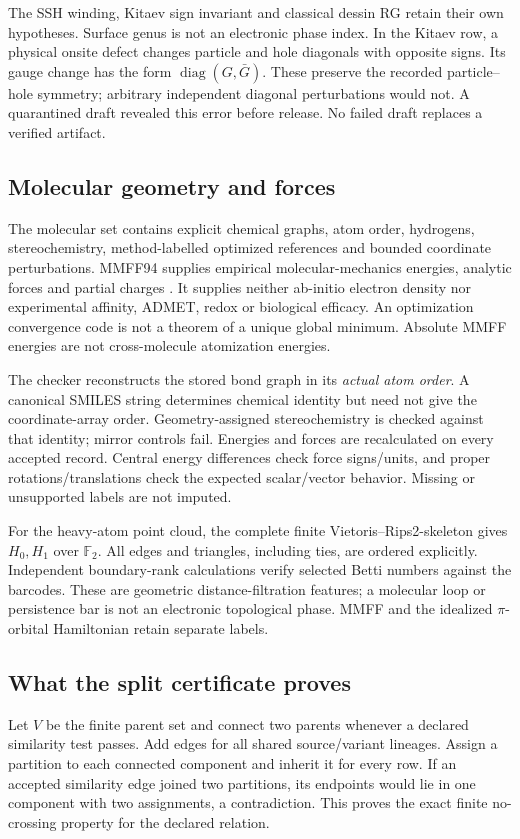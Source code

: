 \documentclass[11pt,oneside,openany]{book}
\theoremstyle{definition}\newtheorem{definition}[theorem]{Definition}
\theoremstyle{remark}\newtheorem{remark}[theorem]{Remark}
\begin{document}
The SSH winding, Kitaev sign invariant and classical dessin RG retain their
own hypotheses. Surface genus is not an electronic phase index. In the
Kitaev row, a physical onsite defect changes particle and hole diagonals with
opposite signs. Its gauge change has the form $\operatorname{diag}(G,\bar G)$.
These preserve the recorded particle--hole symmetry; arbitrary independent
diagonal perturbations would not. A quarantined draft revealed this error
before release. No failed draft replaces a verified artifact.

\subsection{Molecular geometry and forces}
The molecular set contains explicit chemical graphs, atom order, hydrogens,
stereochemistry, method-labelled optimized references and bounded coordinate
perturbations. MMFF94 supplies empirical molecular-mechanics energies, analytic
forces and partial charges \cite{DSRDKit}. It supplies neither ab-initio
electron density nor experimental affinity, ADMET, redox or biological efficacy.
An optimization convergence code is not a theorem of a unique global minimum.
Absolute MMFF energies are not cross-molecule atomization energies.

The checker reconstructs the stored bond graph in its \emph{actual atom order}.
A canonical SMILES string determines chemical identity but need not give the
coordinate-array order. Geometry-assigned stereochemistry is checked against
that identity; mirror controls fail. Energies and forces are recalculated on
every accepted record. Central energy differences check force signs/units,
and proper rotations/translations check the expected scalar/vector behavior.
Missing or unsupported labels are not imputed.

For the heavy-atom point cloud, the complete finite Vietoris--Rips2-skeleton
gives $H_0,H_1$ over $\mathbb F_2$. All edges and triangles, including ties,
are ordered explicitly. Independent boundary-rank calculations verify selected
Betti numbers against the barcodes. These are geometric distance-filtration
features; a molecular loop or persistence bar is not an electronic topological
phase. MMFF and the idealized $\pi$-orbital Hamiltonian retain separate labels.

\subsection{What the split certificate proves}
Let $V$ be the finite parent set and connect two parents whenever a declared
similarity test passes. Add edges for all shared source/variant lineages.
Assign a partition to each connected component and inherit it for every row.
If an accepted similarity edge joined two partitions, its endpoints would lie
in one component with two assignments, a contradiction. This proves the exact
finite no-crossing property for the declared relation.
\end{document}
